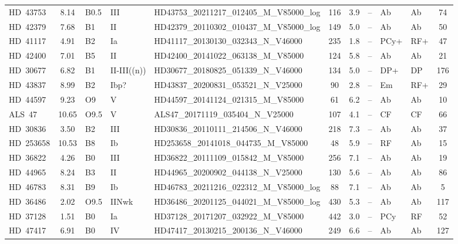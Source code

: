 {\begin{landscape}
\begin{longtable}{lclllcclllc}
\noalign{\smallskip}
HD~43753 & 8.14 & B0.5 & III & HD43753\_20211217\_012405\_M\_V85000\_log & 116 & 3.9 & -- & Ab & Ab & 74 \\
\noalign{\smallskip}
HD~42379 & 7.68 & B1 & II & HD42379\_20110302\_010437\_M\_V85000\_log & 149 & 5.0 & -- & Ab & Ab & 50 \\
\noalign{\smallskip}
HD~41117 & 4.91 & B2 & Ia & HD41117\_20130130\_032343\_N\_V46000 & 235 & 1.8 & -- & PCy+ & RF+ & 47 \\
\noalign{\smallskip}
HD~42400 & 7.01 & B5 & II & HD42400\_20141022\_063138\_M\_V85000 & 124 & 5.8 & -- & Ab & Ab & 21 \\
\noalign{\smallskip}
HD~30677 & 6.82 & B1 & II-III((n)) & HD30677\_20180825\_051339\_N\_V46000 & 134 & 5.0 & -- & DP+ & DP & 176 \\
\noalign{\smallskip}
HD~43837 & 8.99 & B2 & Ibp? & HD43837\_20200831\_053521\_N\_V25000 & 90 & 2.8 & -- & Em & RF+ & 29 \\
\noalign{\smallskip}
HD~44597 & 9.23 & O9 & V & HD44597\_20141124\_021315\_M\_V85000 & 61 & 6.2 & -- & Ab & Ab & 10 \\
\noalign{\smallskip}
ALS~47 & 10.65 & O9.5 & V & ALS47\_20171119\_035404\_N\_V25000 & 107 & 4.1 & -- & CF & CF & 66 \\
\noalign{\smallskip}
HD~30836 & 3.50 & B2 & III & HD30836\_20110111\_214506\_N\_V46000 & 218 & 7.3 & -- & Ab & Ab & 37 \\
\noalign{\smallskip}
HD~253658 & 10.53 & B8 & Ib & HD253658\_20141018\_044735\_M\_V85000 & 48 & 5.9 & -- & RF & Ab & 15 \\
\noalign{\smallskip}
HD~36822 & 4.26 & B0 & III & HD36822\_20111109\_015842\_M\_V85000 & 256 & 7.1 & -- & Ab & Ab & 19 \\
\noalign{\smallskip}
HD~44965 & 8.24 & B3 & II & HD44965\_20200902\_044138\_N\_V25000 & 130 & 5.6 & -- & Ab & Ab & 86 \\
\noalign{\smallskip}
HD~46783 & 8.31 & B9 & Ib & HD46783\_20211216\_022312\_M\_V85000\_log & 88 & 7.1 & -- & Ab & Ab & 5 \\
\noalign{\smallskip}
HD~36486 & 2.02 & O9.5 & IINwk & HD36486\_20201125\_044021\_M\_V85000\_log & 430 & 5.3 & -- & Ab & Ab & 117 \\
\noalign{\smallskip}
HD~37128 & 1.51 & B0 & Ia & HD37128\_20171207\_032922\_M\_V85000 & 442 & 3.0 & -- & PCy & RF & 52 \\
\noalign{\smallskip}
HD~47417 & 6.91 & B0 & IV & HD47417\_20130215\_200136\_N\_V46000 & 249 & 6.6 & -- & Ab & Ab & 127 \\

\end{longtable}
\end{landscape}}
